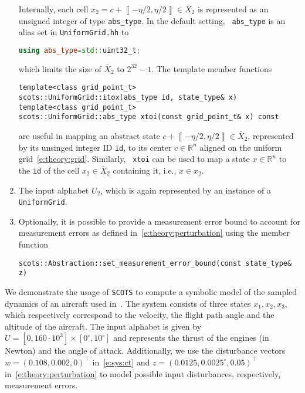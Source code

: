 \documentclass[a4paper]{amsart}
\newcommand{\segcc}[1]{\ensuremath{{\left\llbracket#1\right\rrbracket}}}
\newcommand{\intcc}[1]{\ensuremath{{\left[#1\right]}}}
\newcommand{\R}{\mathbb{R}}
\begin{document}
\begin{enumerate}
	Internally, each cell $x_2=c+\segcc{-\eta/2,\eta/2}\in\bar X_2$ is represented
  as an unsigned integer of type {\tt abs\_type}. In the default setting, {\tt
  abs\_type} is an alias set in {\tt UniformGrid.hh} to 
\begin{lstlisting}[basicstyle=\small\ttfamily, language=C++]
using abs_type=std::uint32_t;
\end{lstlisting}
  which limits the size of $\bar X_2$ to $2^{32}-1$. The template member functions 
\begin{lstlisting}[basicstyle=\small\ttfamily]
template<class grid_point_t>
scots::UniformGrid::itox(abs_type id, state_type& x)
template<class grid_point_t>
scots::UniformGrid::abs_type xtoi(const grid_point_t& x) const 
\end{lstlisting}
  are useful in mapping an abstract state $c+\segcc{-\eta/2,\eta/2}\in
  \bar X_2$, represented by its unsinged integer ID {\tt id}, to its center
  $c\in \R^n$ aligned on the uniform grid~\eqref{e:theory:grid}. Similarly, {\tt
  xtoi} can be used to map a state $x\in \R^n$ to the {\tt id} of the cell
  $x_2\in\bar X_2$ containing it, i.e., $x\in x_2$.

  \item The input alphabet $U_2$, which is again represented by an instance
  of a {\tt UniformGrid}.

  \item Optionally, it is possible to provide a measurement error bound to
  account for measurement errors as defined in~\eqref{e:theory:perturbation} using the
  member function
\begin{lstlisting}[basicstyle=\small\ttfamily]
scots::Abstraction::set_measurement_error_bound(const state_type& z)
\end{lstlisting}
\end{enumerate}

We demonstrate the usage of {\tt SCOTS} to compute a symbolic
model of the sampled dynamics of an aircraft used
in~\cite[Sec.~IX.B]{ReissigWeberRungger15}. The system consists of three states $x_1,x_2,x_3$, which respectively correspond to the velocity, the flight path angle and the altitude of the
aircraft. The input alphabet is given by $U =
\intcc{0,160\cdot 10^3} \times \intcc{0^\circ,10^\circ}$ 
and represents the thrust of the engines (in Newton) and the angle of attack.
Additionally, we use the disturbance vectors $w=(0.108,0.002,0)^\top$
in~\eqref{e:sys:ct} and  $z=(0.0125,0.0025^\circ,0.05)^\top$
in~\eqref{e:theory:perturbation} to model possible input
disturbances, respectively, measurement errors.
\end{document}
